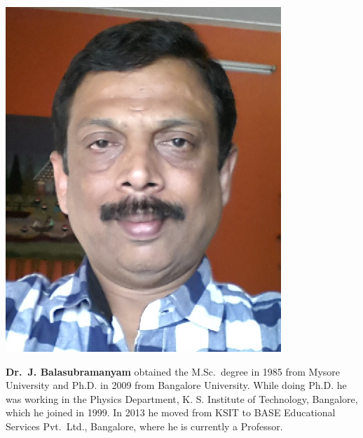 \centerline{\includegraphics[scale=0.8]{authorsphotos/J_Balasubramanyam.eps}}
\medskip

\noindent
\textbf{Dr.\ J. Balasubramanyam} obtained the M.Sc.\ degree in 1985 from Mysore University and Ph.D. in 2009 from Bangalore University. While doing Ph.D. he was working in the Physics Department, K. S. Institute of Technology, Bangalore, which he joined in 1999. In 2013 he moved from KSIT to BASE Educational Services Pvt.\ Ltd., Bangalore, where he is currently a Professor.

